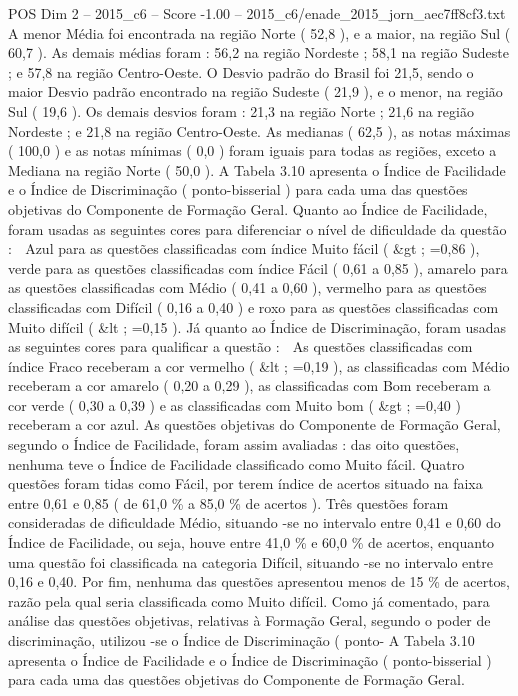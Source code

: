 \begin{textsample}{POS Dim 2 – 2015\_c6 – Score -1.00 – 2015\_c6/enade\_2015\_jorn\_aec7ff8cf3.txt}
A menor Média foi encontrada na região Norte ( 52,8 ), e a maior, na região Sul ( 60,7 ).
As demais médias foram : 56,2 na região Nordeste ; 58,1 na região Sudeste ; e 57,8 na região Centro-Oeste.
O Desvio padrão do Brasil foi 21,5, sendo o maior Desvio padrão encontrado na região Sudeste ( 21,9 ), e o menor, na região Sul ( 19,6 ).
Os demais desvios foram : 21,3 na região Norte ; 21,6 na região Nordeste ; e 21,8 na região Centro-Oeste.
As medianas ( 62,5 ), as notas máximas ( 100,0 ) e as notas mínimas ( 0,0 ) foram iguais para todas as regiões, exceto a Mediana na região Norte ( 50,0 ).
A Tabela 3.10 apresenta o Índice de Facilidade e o Índice de Discriminação ( ponto-bisserial ) para cada uma das questões objetivas do Componente de Formação Geral.
Quanto ao Índice de Facilidade, foram usadas as seguintes cores para diferenciar o nível de dificuldade da questão :  Azul para as questões classificadas com índice Muito fácil ( \&gt ; =0,86 ), verde para as questões classificadas com índice Fácil ( 0,61 a 0,85 ), amarelo para as questões classificadas com Médio ( 0,41 a 0,60 ), vermelho para as questões classificadas com Difícil ( 0,16 a 0,40 ) e roxo para as questões classificadas com Muito difícil ( \&lt ; =0,15 ).
Já quanto ao Índice de Discriminação, foram usadas as seguintes cores para qualificar a questão :  As questões classificadas com índice Fraco receberam a cor vermelho ( \&lt ; =0,19 ), as classificadas com Médio receberam a cor amarelo ( 0,20 a 0,29 ), as classificadas com Bom receberam a cor verde ( 0,30 a 0,39 ) e as classificadas com Muito bom ( \&gt ; =0,40 ) receberam a cor azul.
As questões objetivas do Componente de Formação Geral, segundo o Índice de Facilidade, foram assim avaliadas : das oito questões, nenhuma teve o Índice de Facilidade classificado como Muito fácil.
Quatro questões foram tidas como Fácil, por terem índice de acertos situado na faixa entre 0,61 e 0,85 ( de 61,0 \% a 85,0 \% de acertos ).
Três questões foram consideradas de dificuldade Médio, situando -se no intervalo entre 0,41 e 0,60 do Índice de Facilidade, ou seja, houve entre 41,0 \% e 60,0 \% de acertos, enquanto uma questão foi classificada na categoria Difícil, situando -se no intervalo entre 0,16 e 0,40.
Por fim, nenhuma das questões apresentou menos de 15 \% de acertos, razão pela qual seria classificada como Muito difícil.
Como já comentado, para análise das questões objetivas, relativas à Formação Geral, segundo o poder de discriminação, utilizou -se o Índice de Discriminação ( ponto- A Tabela 3.10 apresenta o Índice de Facilidade e o Índice de Discriminação ( ponto-bisserial ) para cada uma das questões objetivas do Componente de Formação Geral.

\end{textsample}
